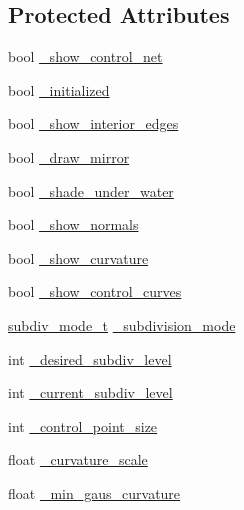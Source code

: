 \subsection*{Protected Attributes}
\begin{DoxyCompactItemize}
\item 
bool \hyperlink{classShipCAD_1_1SubdivisionSurface_ab9bb374cf1368b4a2c779f953bca88a8}{\+\_\+show\+\_\+control\+\_\+net}
\item 
bool \hyperlink{classShipCAD_1_1SubdivisionSurface_a828f85ee49e1481e95f61b919070842c}{\+\_\+initialized}
\item 
bool \hyperlink{classShipCAD_1_1SubdivisionSurface_a4458d02152bd97495938586c89e6d9e2}{\+\_\+show\+\_\+interior\+\_\+edges}
\item 
bool \hyperlink{classShipCAD_1_1SubdivisionSurface_a4ee73ae98bddfe1819419afd1d5ba029}{\+\_\+draw\+\_\+mirror}
\item 
bool \hyperlink{classShipCAD_1_1SubdivisionSurface_ac3294d41679de31e588d603e3428565e}{\+\_\+shade\+\_\+under\+\_\+water}
\item 
bool \hyperlink{classShipCAD_1_1SubdivisionSurface_a0cc840743e7afcd136ab864ace158a17}{\+\_\+show\+\_\+normals}
\item 
bool \hyperlink{classShipCAD_1_1SubdivisionSurface_abe2167085eac50c986b074635b610462}{\+\_\+show\+\_\+curvature}
\item 
bool \hyperlink{classShipCAD_1_1SubdivisionSurface_ae240b2177e0af0bd1512c94b524f22dd}{\+\_\+show\+\_\+control\+\_\+curves}
\item 
\hyperlink{namespaceShipCAD_a4a9d1acfd6a2e1e9078a5dcc36f0c817}{subdiv\+\_\+mode\+\_\+t} \hyperlink{classShipCAD_1_1SubdivisionSurface_a0af5c881dfa24574962f42d80da997ee}{\+\_\+subdivision\+\_\+mode}
\item 
int \hyperlink{classShipCAD_1_1SubdivisionSurface_aeec20f09be87e6d57d88f903853ca96f}{\+\_\+desired\+\_\+subdiv\+\_\+level}
\item 
int \hyperlink{classShipCAD_1_1SubdivisionSurface_a9e5424746eced5d0a06ccbe4055bd06f}{\+\_\+current\+\_\+subdiv\+\_\+level}
\item 
int \hyperlink{classShipCAD_1_1SubdivisionSurface_a7ad820b9d312c8ecde939b5345690d35}{\+\_\+control\+\_\+point\+\_\+size}
\item 
float \hyperlink{classShipCAD_1_1SubdivisionSurface_acf241b41a8ca897306decbbab8e44c69}{\+\_\+curvature\+\_\+scale}
\item 
float \hyperlink{classShipCAD_1_1SubdivisionSurface_ac343c30f7e4e6a5926fdfed7da3f9385}{\+\_\+min\+\_\+gaus\+\_\+curvature}

\end{DoxyCompactItemize}
